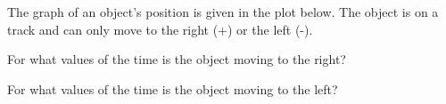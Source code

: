 \begin{problem}
  \clearpage

\item The graph of an object's position is given in the plot
  below. The object is on a track and can only move to the right (+)
  or the left (-).

  \scalebox{0.4}{}

  \begin{subproblem}
    \item For what values of the time is the object moving to the
      right?
      \vfill
    \item For what values of the time is the object moving to the
      left?
      \vfill
  \end{subproblem}


\end{problem}

